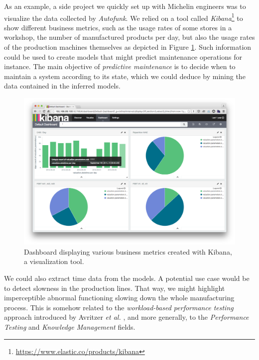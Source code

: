 As an example, a side project we quickly set up with Michelin
engineers was to visualize the data collected by
\textit{Autofunk}. We relied on a tool called
\emph{Kibana}\footnote{\url{https://www.elastic.co/products/kibana}}
to show different business metrics, such as the usage rates of
some stores in a workshop, the number of manufactured products
per day, but also the usage rates of the production machines
themselves as depicted in Figure \ref{fig:kibana}. Such
information could be used to create models that might predict
maintenance operations for instance.  The main objective of
\emph{predictive maintenance} \cite{mobley2002introduction} is to
decide when to maintain a system according to its state, which we
could deduce by mining the data contained in the inferred models.

\begin{figure}[h]
    \begin{center}
        \includegraphics[width=1.0\linewidth]{figures/kibana.png}
    \end{center}

    \caption{Dashboard displaying various business metrics
    created with Kibana, a visualization tool.}
    \label{fig:kibana}
\end{figure}

We could also extract time data from the models. A potential use
case would be to detect slowness in the production lines. That
way, we might highlight imperceptible abnormal functioning
slowing down the whole manufacturing process. This is somehow
related to the \emph{workload-based performance testing} approach
introduced by Avritzer \emph{et al.} \cite{avritzer2002software},
and more generally, to the \emph{Performance Testing}
\cite{vokolos1998performance} and \emph{Knowledge Management}
\cite{pachidi2015performance} fields.

